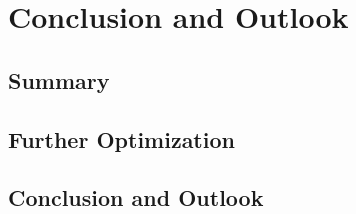 \chapter{Conclusion and Outlook}
\label{cha:Conclusion}

\section{Summary}
\label{sec:summary}

\section{Further Optimization }
\label{sec:Further}

\section{Conclusion and Outlook}
\label{sec:Recommendation}